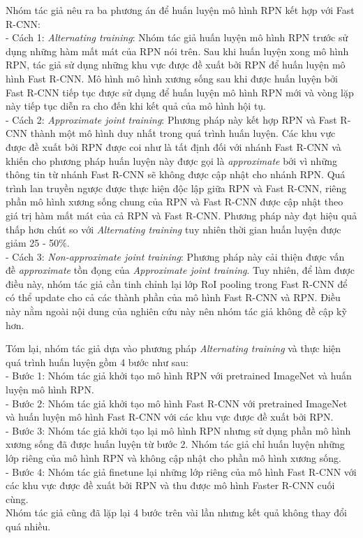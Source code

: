 {    \noindent
    Nhóm tác giả nêu ra ba phương án để huấn luyện mô hình RPN kết hợp với Fast R-CNN: \\
    - Cách 1: \textit{Alternating training}: Nhóm tác giả huấn luyện mô hình RPN trước sử dụng những hàm mất mát của RPN nói trên.
    Sau khi huấn luyện xong mô hình RPN, tác giả sử dụng những khu vực được đề xuất bởi RPN để huấn luyện mô hình Fast R-CNN.
    Mô hình mô hình xương sống sau khi được huấn luyện bởi Fast R-CNN tiếp tục được sử dụng để huấn luyện mô hình RPN mới và vòng lặp này tiếp tục diễn ra cho đến khi kết quả của mô hình hội tụ. \\
    - Cách 2: \textit{Approximate joint training}: Phương pháp này kết hợp RPN và Fast R-CNN thành một mô hình duy nhất trong quá trình huấn luyện.
    Các khu vực được đề xuất bởi RPN được coi như là tất định đối với nhánh Fast R-CNN và khiến cho phương pháp huấn luyện này được gọi là \textit{approximate} bởi vì những thông tin từ nhánh Fast R-CNN sẽ không được cập nhật cho nhánh RPN.
    Quá trình lan truyền ngược được thực hiện độc lập giữa RPN và Fast R-CNN, riêng phần mô hình xương sống chung của RPN và Fast R-CNN được cập nhật theo giá trị hàm mất mát của cả RPN và Fast R-CNN.
    Phương pháp này đạt hiệu quả thấp hơn chút so với \textit{Alternating training} tuy nhiên thời gian huấn luyện được giảm 25 - 50\%. \\
    - Cách 3: \textit{Non-approximate joint training}: Phương pháp này cải thiện được vấn đề \textit{approximate} tồn đọng của \textit{Approximate joint training}.
    Tuy nhiên, để làm được điều này, nhóm tác giả cần tinh chỉnh lại lớp RoI pooling trong Fast R-CNN để có thể update cho cả các thành phần của mô hình Fast R-CNN và RPN.
    Điều này nằm ngoài nội dung của nghiên cứu này nên nhóm tác giả không đề cập kỹ hơn.

    \noindent
    Tóm lại, nhóm tác giả dựa vào phương pháp \textit{Alternating training} và thực hiện quá trình huấn luyện gồm 4 bước như sau: \\
    - Bước 1: Nhóm tác giả khởi tạo mô hình RPN với pretrained ImageNet và huấn luyện mô hình RPN. \\
    - Bước 2: Nhóm tác giả khởi tạo mô hình Fast R-CNN với pretrained ImageNet và huấn luyện mô hình Fast R-CNN với các khu vực được đề xuất bởi RPN. \\
    - Bước 3: Nhóm tác giả khởi tạo lại mô hình RPN nhưng sử dụng phần mô hình xương sống đã được huấn luyện từ bước 2.
    Nhóm tác giả chỉ huấn luyện những lớp riêng của mô hình RPN và không cập nhật cho phần mô hình xương sống. \\
    - Bước 4: Nhóm tác giả finetune lại những lớp riêng của mô hình Fast R-CNN với các khu vực được đề xuất bởi RPN và thu được mô hình Faster R-CNN cuối cùng. \\
    Nhóm tác giả cũng đã lặp lại 4 bước trên vài lần nhưng kết quả không thay đổi quá nhiều.

}
